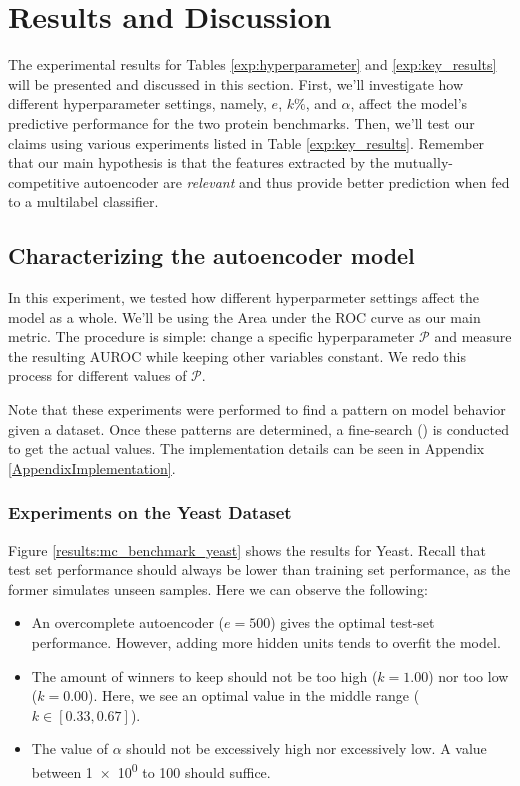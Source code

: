 \section{Results and Discussion}
\label{MCResults}

The experimental results for Tables \ref{exp:hyperparameter} and
\ref{exp:key_results} will be presented and discussed in this section. First,
we'll investigate how different hyperparameter settings, namely, $e$, $k\%$,
and $\alpha$, affect the model's predictive performance for the two protein
benchmarks. Then, we'll test our claims using various experiments listed in
Table \ref{exp:key_results}. Remember that our main hypothesis is that the
features extracted by the mutually-competitive autoencoder are
\textit{relevant} and thus provide better prediction when fed to a multilabel
classifier.

\newpage
\subsection{Characterizing the autoencoder model}

In this experiment, we tested how different hyperparmeter settings affect the
model as a whole. We'll be using the Area under the ROC curve as our main
metric. The procedure is simple: change a specific hyperparameter
$\mathcal{P}$ and measure the resulting AUROC while keeping other variables
constant. We redo this process for different values of $\mathcal{P}$. 

\par Note that these experiments were performed to find a pattern on model
behavior given a dataset. Once these patterns are determined, a fine-search
(\cite{bergstra2012random}) is conducted to get the actual values. The
implementation details can be seen in Appendix \ref{AppendixImplementation}.

\subsubsection{Experiments on the Yeast Dataset}

Figure \ref{results:mc_benchmark_yeast} shows the results for Yeast. Recall
that test set performance should always be lower than training set
performance, as the former simulates unseen samples. Here we can observe the
following:

\begin{itemize}
  \item An overcomplete autoencoder ($e=500$) gives the optimal test-set
  performance. However, adding more hidden units tends to overfit the model.
  \item The amount of winners to keep should not be too high ($k=1.00$) nor too low ($k=0.00$). Here, we see an optimal value in the middle range ($k\in\left[0.33, 0.67\right]$).
  \item The value of $\alpha$ should not be excessively high nor excessively low. A value between \num{1e0} to \num{100} should suffice.
\end{itemize}

